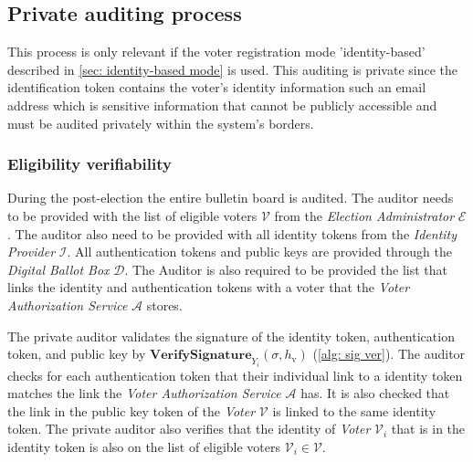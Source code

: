 \subsection{Private auditing process} \label{sec: private auditing process}
This process is only relevant if the voter registration mode 'identity-based' described in \cref{sec: identity-based mode} is used. This auditing is private since the identification token contains the voter's identity information such an email address which is sensitive information that cannot be publicly accessible and must be audited privately within the system's borders.


\subsubsection{Eligibility verifiability}
During the post-election the entire bulletin board is audited. The auditor needs to be provided with the list of eligible voters $\boldsymbol{\mathcal{V}}$ from the \textit{Election Administrator} $\mathcal{E}$. The auditor also need to be provided with all identity tokens from the \textit{Identity Provider} $\mathcal{I}$. All authentication tokens and public keys are provided through the \textit{Digital Ballot Box} $\mathcal{D}$. The Auditor is also required to be provided the list that links the identity and authentication tokens with a voter that the \textit{Voter Authorization Service} $\mathcal{A}$ stores. 

The private auditor validates the signature of the identity token, authentication token, and public key by \( \mathbf{VerifySignature}_{Y_i} (\sigma, h_\mathrm{v}) \) (\cref{alg: sig ver}). The auditor checks for each authentication token that their individual link to a identity token matches the link the \textit{Voter Authorization Service} $\mathcal{A}$ has. It is also checked that the link in the public key token of the \textit{Voter} $\mathcal{V}$ is linked to the same identity token. The private auditor also verifies that the identity of \textit{Voter} $\mathcal{V}_i$ that is in the identity token is also on the list of eligible voters $\mathcal{V}_i \in \boldsymbol{\mathcal{V}}$. 
